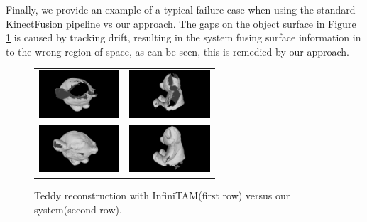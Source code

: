 Finally, we provide an example of a typical failure case when using the standard KinectFusion pipeline vs our approach. The gaps on the object surface in Figure \ref{fig:gappy_teddy} 
is caused by tracking drift, resulting in the system fusing surface information in to the wrong region of space, as can be seen, this is remedied by our approach.
\begin{figure}[!t]
	\centering
	\begin{tabular}{cc}
		\includegraphics[width=3cm]{screenshots/GappyTeddy/one_scene00.png}&
		\includegraphics[width=3cm]{screenshots/GappyTeddy/one_scene01.png}\\
		\includegraphics[width=3cm]{screenshots/GappyTeddy/multi_scene00.png}&
		\includegraphics[width=3cm]{screenshots/GappyTeddy/multi_scene01.png}\\
	\end{tabular}
	\vspace{-3mm}
	\caption{
		Teddy reconstruction with InfiniTAM(first row) versus our system(second row).
	}
	\label{fig:gappy_teddy}
\end{figure}

